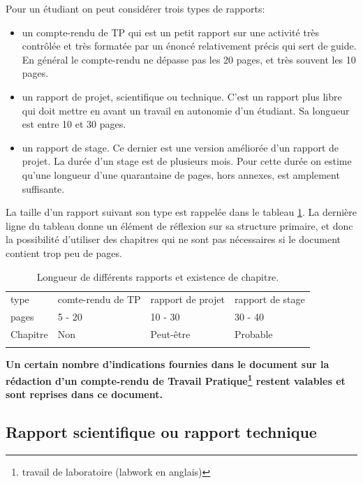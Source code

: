 Pour un étudiant on peut considérer trois types de rapports:
\begin{itemize}
\item un compte-rendu de TP  qui est un petit rapport sur une activité très contrôlée et très formatée par un énoncé relativement précis qui sert de guide.
En général le compte-rendu ne dépasse pas les 20 pages, et très souvent les 10 pages.
\item un rapport de projet, scientifique ou technique. C'est un rapport plus libre qui doit mettre en avant un travail en autonomie d'un étudiant. 
Sa longueur est entre 10 et 30 pages. 
\item un rapport de stage. Ce dernier est une version améliorée d'un rapport de projet. La durée d'un stage est de plusieurs mois. Pour cette durée
 on estime qu'une longueur d'une quarantaine de pages, hors annexes, est amplement suffisante.
\end{itemize}

La taille d'un rapport suivant son type  est rappelée dans le tableau \ref{table:report}. 
La dernière ligne du tableau donne un élément de réflexion sur sa structure primaire, et donc la  possibilité d'utiliser
 des chapitres qui ne sont pas nécessaires si le document contient trop peu de pages.

\begin{table}[htb]
\small
\centering
\begin{tabular}{p{2cm} p{4.5cm} p{4.5cm} p{4.5cm}}
 \Xhline{2pt}
type &   comte-rendu de TP  & rapport de projet &  rapport de stage \\ \Xhline{1pt}
pages &  5 - 20              & 10 - 30          &  30 - 40 \\
Chapitre & Non               & Peut-être        & Probable \\  \Xhline{2pt}
\end{tabular}
\caption{Longueur de différents rapports et existence de chapitre.}
\label{table:report}
\end{table}

\textbf{Un certain nombre d'indications fournies dans le document sur la rédaction d'un compte-rendu de Travail Pratique\footnote{travail de laboratoire (labwork en anglais)} restent valables et sont reprises dans ce document.}


\subsection{Rapport scientifique ou rapport technique}

